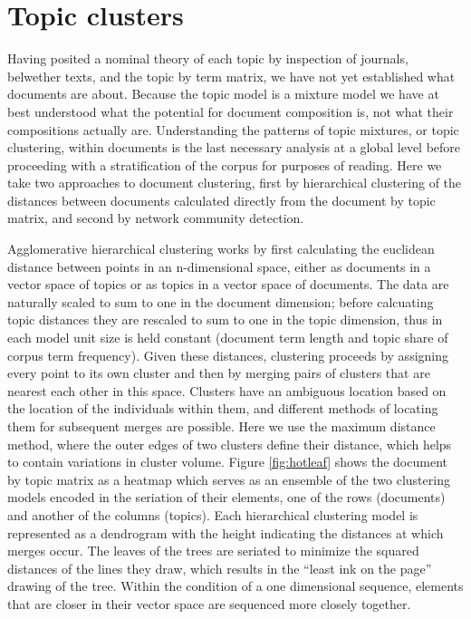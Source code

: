 \documentclass[]{book}
\theoremstyle{definition}
\theoremstyle{definition}
\theoremstyle{definition}
\theoremstyle{remark}
\begin{document}
\hypertarget{topic-clusters}{%
\section{Topic clusters}\label{topic-clusters}}

Having posited a nominal theory of each topic by inspection of journals,
belwether texts, and the topic by term matrix, we have not yet
established what documents are about. Because the topic model is a
mixture model we have at best understood what the potential for document
composition is, not what their compositions actually are. Understanding
the patterns of topic mixtures, or topic clustering, within documents is
the last necessary analysis at a global level before proceeding with a
stratification of the corpus for purposes of reading. Here we take two
approaches to document clustering, first by hierarchical clustering of
the distances between documents calculated directly from the document by
topic matrix, and second by network community detection.

Agglomerative hierarchical clustering works by first calculating the
euclidean distance between points in an n-dimensional space, either as
documents in a vector space of topics or as topics in a vector space of
documents. The data are naturally scaled to sum to one in the document
dimension; before calcuating topic distances they are rescaled to sum to
one in the topic dimension, thus in each model unit size is held
constant (document term length and topic share of corpus term
frequency). Given these distances, clustering proceeds by assigning
every point to its own cluster and then by merging pairs of clusters
that are nearest each other in this space. Clusters have an ambiguous
location based on the location of the individuals within them, and
different methods of locating them for subsequent merges are possible.
Here we use the maximum distance method, where the outer edges of two
clusters define their distance, which helps to contain variations in
cluster volume. Figure \ref{fig:hotleaf} shows the document by topic
matrix as a heatmap which serves as an ensemble of the two clustering
models encoded in the seriation of their elements, one of the rows
(documents) and another of the columns (topics). Each hierarchical
clustering model is represented as a dendrogram with the height
indicating the distances at which merges occur. The leaves of the trees
are seriated to minimize the squared distances of the lines they draw,
which results in the ``least ink on the page'' drawing of the tree.
Within the condition of a one dimensional sequence, elements that are
closer in their vector space are sequenced more closely together.
\end{document}
